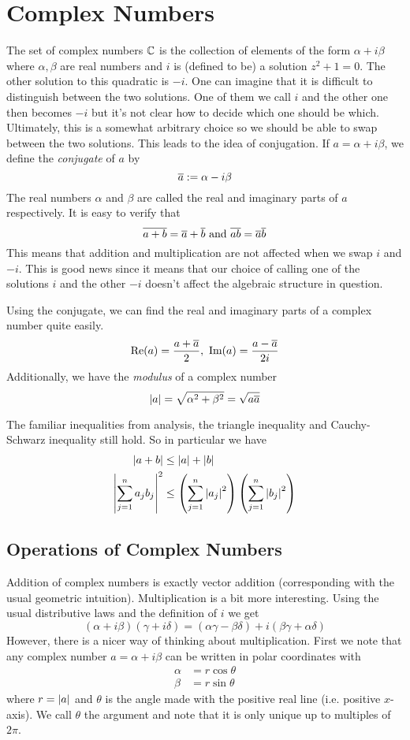 \section{Complex Numbers}
The set of complex numbers $\mathbb{C}$ is the collection of elements of the form $\alpha + i \beta$ where $\alpha, \beta$ are real numbers and $i$ is (defined to be) a solution $z^2 + 1 = 0$. The other solution to this quadratic is $-i$. One can imagine that it is difficult to distinguish between the two solutions. One of them we call $i$ and the other one then becomes $-i$ but it's not clear how to decide which one should be which. Ultimately, this is a somewhat arbitrary choice so we should be able to swap between the two solutions. This leads to the idea of conjugation. If $a = \alpha + i \beta$, we define the \textit{conjugate} of $a$ by
$$\overline{a} := \alpha - i\beta$$
The real numbers $\alpha$ and $\beta$ are called the real and imaginary parts of $a$ respectively.
It is easy to verify that 
$$ \overline{a + b} = \overline{a} + \overline{b} \text{ and } \overline{ab} = \overline{a}\overline{b} $$
This means that addition and multiplication are not affected when we swap $i$ and $-i$. This is good news since it means that our choice of calling one of the solutions $i$ and the other $-i$ doesn't affect the algebraic structure in question.

Using the conjugate, we can find the real and imaginary parts of a complex number quite easily.
$$\text{Re}(a) = \frac{a + \overline{a}}{2}, \ \text{Im}(a) = \frac{a - \overline{a}}{2i}$$
Additionally, we have the \textit{modulus} of a complex number
$$ \left|a\right| = \sqrt{\alpha^2 + \beta^2} = \sqrt{a \overline{a}} $$

The familiar inequalities from analysis, the triangle inequality and Cauchy-Schwarz inequality still hold. So in particular we have
\begin{align*}
    \left|a + b\right| &\leq \left|a\right| + \left|b\right|\\
    \left|\sum_{j = 1}^n a_j b_j\right|^2 &\leq \left( \sum_{j = 1}^n \left|a_j\right|^2 \right) \left( \sum_{j = 1}^n \left|b_j\right|^2 \right)
\end{align*}

\subsection{Operations of Complex Numbers}
Addition of complex numbers is exactly vector addition (corresponding with the usual geometric intuition). Multiplication is a bit more interesting. Using the usual distributive laws and the definition of $i$ we get 
$$(\alpha + i \beta)(\gamma + i \delta) = (\alpha \gamma - \beta \delta) + i(\beta \gamma + \alpha \delta)$$
However, there is a nicer way of thinking about multiplication.
First we note that any complex number $a = \alpha + i \beta$ can be written in polar coordinates with 
\begin{align*}
    \alpha &= r \cos \theta\\
    \beta &= r \sin \theta
\end{align*}
where $r = \left|a\right|$ and $\theta$ is the angle made with the positive real line (i.e. positive $x$-axis). We call $\theta$ the argument and note that it is only unique up to multiples of $2\pi$. 

